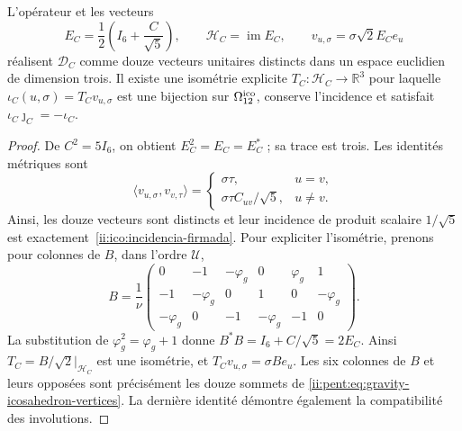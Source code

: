 \begin{samepage}
\begin{proposition}
\label{ii:ico:realizacion-firmada}
L'opérateur et les vecteurs
\begin{equation}
 E_C=\frac12\left(I_6+\frac C{\sqrt5}\right),\qquad
 \mathcal H_C=\operatorname{im}E_C,\qquad
 v_{u,\sigma}=\sigma\sqrt2 E_Ce_u
 \label{ii:ico:proyector-seis}
\end{equation}
réalisent \(\mathcal D_C\) comme douze vecteurs unitaires distincts dans un
espace euclidien de dimension trois. Il existe une isométrie explicite
\(T_C:\mathcal H_C\to\mathbb R^3\) pour laquelle
\(\iota_C(u,\sigma)=T_Cv_{u,\sigma}\) est une bijection sur
\(\Omega_{12}^{\rm ico}\), conserve l'incidence et satisfait
\(\iota_C\jmath_C=-\iota_C\).
\end{proposition}
\end{samepage}
\begin{proof}
De \(C^2=5I_6\), on obtient \(E_C^2=E_C=E_C^*\) ; sa trace est trois.
Les identités métriques sont
\[
 \langle v_{u,\sigma},v_{v,\tau}\rangle
 =\begin{cases}\sigma\tau,&u=v,\\
 \sigma\tau C_{uv}/\sqrt5,&u\ne v.
 \end{cases}
\]
Ainsi, les douze vecteurs sont distincts et leur incidence de produit scalaire
\(1/\sqrt5\) est exactement~\eqref{ii:ico:incidencia-firmada}.
Pour expliciter l'isométrie, prenons pour colonnes de \(B\), dans l'ordre
\(\mathcal U\),
\[
 B=\frac1\nu
 \begin{pmatrix}
 0&-1&-\varphi_g&0&\varphi_g&1\\
 -1&-\varphi_g&0&1&0&-\varphi_g\\
 -\varphi_g&0&-1&-\varphi_g&-1&0
 \end{pmatrix}.
\]
La substitution de \(\varphi_g^2=\varphi_g+1\) donne
\(B^*B=I_6+C/\sqrt5=2E_C\). Ainsi
\(T_C=B/\sqrt2\big|_{\mathcal H_C}\) est une isométrie, et
\(T_Cv_{u,\sigma}=\sigma Be_u\). Les six colonnes de \(B\) et leurs
opposées sont précisément les douze sommets de
\eqref{ii:pent:eq:gravity-icosahedron-vertices}. La dernière identité
démontre également la compatibilité des involutions.
\end{proof}

